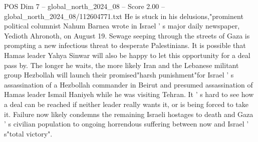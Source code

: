 \begin{textsample}{POS Dim 7 – global\_north\_2024\_08 – Score 2.00 – global\_north\_2024\_08/112604771.txt}
He is stuck in his delusions,"prominent political columnist Nahum Barnea wrote in Israel ' s major daily newspaper, Yedioth Ahronoth, on August 19.
Sewage seeping through the streets of Gaza is prompting a new infectious threat to desperate Palestinians.
It is possible that Hamas leader Yahya Sinwar will also be happy to let this opportunity for a deal pass by.
The longer he waits, the more likely Iran and the Lebanese militant group Hezbollah will launch their promised"harsh punishment"for Israel ' s assassination of a Hezbollah commander in Beirut and presumed assassination of Hamas leader Ismail Haniyeh while he was visiting Tehran.
It ' s hard to see how a deal can be reached if neither leader really wants it, or is being forced to take it.
Failure now likely condemns the remaining Israeli hostages to death and Gaza ' s civilian population to ongoing horrendous suffering between now and Israel ' s"total victory".

\end{textsample}
